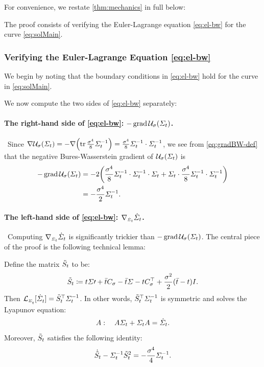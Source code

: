 For convenience, we restate \cref{thm:mechanics} in full below: 
\mechanics*


The proof consists of verifying the Euler-Lagrange equation \eqref{eq:el-bw} for the curve \eqref{eq:solMain}.

\subsubsection{Verifying the Euler-Lagrange Equation \eqref{eq:el-bw}}
\label{sec:verifyEL}
We begin by noting that the boundary conditions in \eqref{eq:el-bw} hold for the curve in \eqref{eq:solMain}. 


We now compute the two sides of \eqref{eq:el-bw} separately:

\paragraph{The right-hand side of \eqref{eq:el-bw}: $-\gradBW\penergyBW$.}
~Since $\nabla \penergyBW = -\nabla \parens*{\tr \frac{\sdev^4}{8} \Sigcurveinv} =  \frac{\sdev^4}{8} \Sigcurveinv\cdot \Sigcurveinv$, we see from \eqref{eq:gradBW-def} that the negative Bures-Wasserstein gradient of $\penergyBW$ is
\begin{align}
\nn
-\gradBW \penergyBW &= -2\parens*{\frac{\sdev^4}{8} \Sigcurveinv\cdot \Sigcurveinv \cdot \Sigcurve + \Sigcurve\cdot \frac{\sdev^4}{8} \Sigcurveinv\cdot \Sigcurveinv } \\
\label{eq:gradBWU}
&= -\frac{\sdev^4}{2} \Sigcurveinv.
\end{align}


\paragraph{The left-hand side of \eqref{eq:el-bw}: $\nabla_{\scriptscriptstyle\dot{\Sigma}_{t}}\dot{\Sigma}_{t}$.}
~Computing $\nabla_{\scriptscriptstyle\dot{\Sigma}_{t}}\dot{\Sigma}_{t}$ is significantly trickier than $-\gradBW\penergyBW$. The central piece of the proof is the following technical lemma:
\begin{lemma}
\label{lem:lyap}
Define the matrix $\tilde{S}_{t}$ to be:
\begin{equation}
\label{eq:Ht}
\tilde{S}_{t} \coloneqq t\Sigma\prime + \bar{t} C_{\sigma} - \bar{t}\Sigma - tC_{\sigma}^\top + \frac{\sigma^2}{2}(\bar{t}-t)I.
\end{equation}Then $\lyap = \Ht^\top \Sigcurveinv$. In other words, $\tilde{S}_{t}^\top \Sigma^{-1}_{t}$ is symmetric and solves the Lyapunov equation:
\begin{equation}
  A: \quad  A\Sigma_{t} + \Sigma_{t} A= \dot{\Sigma}_{t}.
\end{equation}
Moreover, $\tilde{S}_{t}$ satisfies the following identity:
\begin{equation}
\label{eq:ht-id}
\dot{\tilde{S}}_{t} - \Sigma^{-1}_{t} \tilde{S}_{t}^2 =- \frac{\sigma^4}{4} \Sigma^{-1}_{t}.
\end{equation}

\end{lemma}

